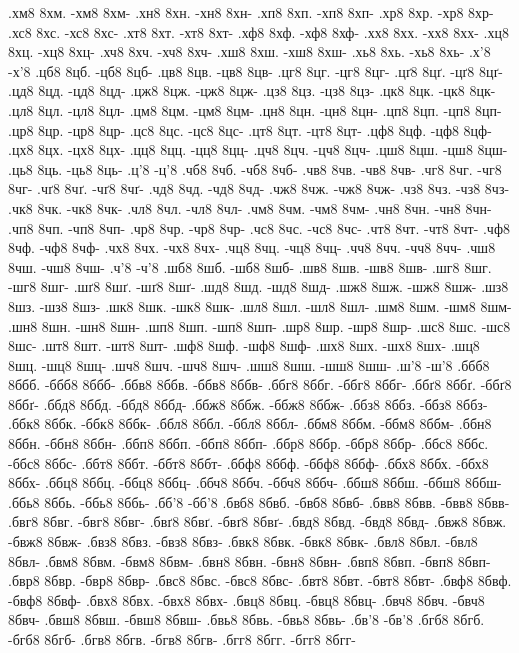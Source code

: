 {.хм8 8хм. -хм8 8хм-
.хн8 8хн. -хн8 8хн-
.хп8 8хп. -хп8 8хп-
.хр8 8хр. -хр8 8хр-
.хс8 8хс. -хс8 8хс-
.хт8 8хт. -хт8 8хт-
.хф8 8хф. -хф8 8хф-
.хх8 8хх. -хх8 8хх-
.хц8 8хц. -хц8 8хц-
.хч8 8хч. -хч8 8хч-
.хш8 8хш. -хш8 8хш-
.хь8 8хь. -хь8 8хь-
.х'8 -х'8
.цб8 8цб. -цб8 8цб-
.цв8 8цв. -цв8 8цв-
.цг8 8цг. -цг8 8цг-
.цґ8 8цґ. -цґ8 8цґ-
.цд8 8цд. -цд8 8цд-
.цж8 8цж. -цж8 8цж-
.цз8 8цз. -цз8 8цз-
.цк8 8цк. -цк8 8цк-
.цл8 8цл. -цл8 8цл-
.цм8 8цм. -цм8 8цм-
.цн8 8цн. -цн8 8цн-
.цп8 8цп. -цп8 8цп-
.цр8 8цр. -цр8 8цр-
.цс8 8цс. -цс8 8цс-
.цт8 8цт. -цт8 8цт-
.цф8 8цф. -цф8 8цф-
.цх8 8цх. -цх8 8цх-
.цц8 8цц. -цц8 8цц-
.цч8 8цч. -цч8 8цч-
.цш8 8цш. -цш8 8цш-
.ць8 8ць. -ць8 8ць-
.ц'8 -ц'8
.чб8 8чб. -чб8 8чб-
.чв8 8чв. -чв8 8чв-
.чг8 8чг. -чг8 8чг-
.чґ8 8чґ. -чґ8 8чґ-
.чд8 8чд. -чд8 8чд-
.чж8 8чж. -чж8 8чж-
.чз8 8чз. -чз8 8чз-
.чк8 8чк. -чк8 8чк-
.чл8 8чл. -чл8 8чл-
.чм8 8чм. -чм8 8чм-
.чн8 8чн. -чн8 8чн-
.чп8 8чп. -чп8 8чп-
.чр8 8чр. -чр8 8чр-
.чс8 8чс. -чс8 8чс-
.чт8 8чт. -чт8 8чт-
.чф8 8чф. -чф8 8чф-
.чх8 8чх. -чх8 8чх-
.чц8 8чц. -чц8 8чц-
.чч8 8чч. -чч8 8чч-
.чш8 8чш. -чш8 8чш-
.ч'8 -ч'8
.шб8 8шб. -шб8 8шб-
.шв8 8шв. -шв8 8шв-
.шг8 8шг. -шг8 8шг-
.шґ8 8шґ. -шґ8 8шґ-
.шд8 8шд. -шд8 8шд-
.шж8 8шж. -шж8 8шж-
.шз8 8шз. -шз8 8шз-
.шк8 8шк. -шк8 8шк-
.шл8 8шл. -шл8 8шл-
.шм8 8шм. -шм8 8шм-
.шн8 8шн. -шн8 8шн-
.шп8 8шп. -шп8 8шп-
.шр8 8шр. -шр8 8шр-
.шс8 8шс. -шс8 8шс-
.шт8 8шт. -шт8 8шт-
.шф8 8шф. -шф8 8шф-
.шх8 8шх. -шх8 8шх-
.шц8 8шц. -шц8 8шц-
.шч8 8шч. -шч8 8шч-
.шш8 8шш. -шш8 8шш-
.ш'8 -ш'8
.ббб8 8ббб. -ббб8 8ббб-
.ббв8 8ббв. -ббв8 8ббв-
.ббг8 8ббг. -ббг8 8ббг-
.ббґ8 8ббґ. -ббґ8 8ббґ-
.ббд8 8ббд. -ббд8 8ббд-
.ббж8 8ббж. -ббж8 8ббж-
.ббз8 8ббз. -ббз8 8ббз-
.ббк8 8ббк. -ббк8 8ббк-
.ббл8 8ббл. -ббл8 8ббл-
.ббм8 8ббм. -ббм8 8ббм-
.ббн8 8ббн. -ббн8 8ббн-
.ббп8 8ббп. -ббп8 8ббп-
.ббр8 8ббр. -ббр8 8ббр-
.ббс8 8ббс. -ббс8 8ббс-
.ббт8 8ббт. -ббт8 8ббт-
.ббф8 8ббф. -ббф8 8ббф-
.ббх8 8ббх. -ббх8 8ббх-
.ббц8 8ббц. -ббц8 8ббц-
.ббч8 8ббч. -ббч8 8ббч-
.ббш8 8ббш. -ббш8 8ббш-
.ббь8 8ббь. -ббь8 8ббь-
.бб'8 -бб'8
.бвб8 8бвб. -бвб8 8бвб-
.бвв8 8бвв. -бвв8 8бвв-
.бвг8 8бвг. -бвг8 8бвг-
.бвґ8 8бвґ. -бвґ8 8бвґ-
.бвд8 8бвд. -бвд8 8бвд-
.бвж8 8бвж. -бвж8 8бвж-
.бвз8 8бвз. -бвз8 8бвз-
.бвк8 8бвк. -бвк8 8бвк-
.бвл8 8бвл. -бвл8 8бвл-
.бвм8 8бвм. -бвм8 8бвм-
.бвн8 8бвн. -бвн8 8бвн-
.бвп8 8бвп. -бвп8 8бвп-
.бвр8 8бвр. -бвр8 8бвр-
.бвс8 8бвс. -бвс8 8бвс-
.бвт8 8бвт. -бвт8 8бвт-
.бвф8 8бвф. -бвф8 8бвф-
.бвх8 8бвх. -бвх8 8бвх-
.бвц8 8бвц. -бвц8 8бвц-
.бвч8 8бвч. -бвч8 8бвч-
.бвш8 8бвш. -бвш8 8бвш-
.бвь8 8бвь. -бвь8 8бвь-
.бв'8 -бв'8
.бгб8 8бгб. -бгб8 8бгб-
.бгв8 8бгв. -бгв8 8бгв-
.бгг8 8бгг. -бгг8 8бгг-
}
